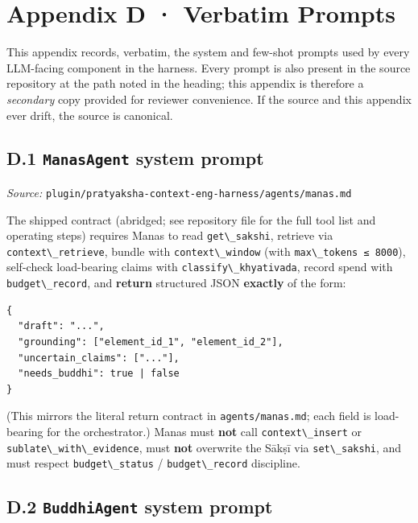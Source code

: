 \section{Appendix D · Verbatim Prompts}\label{appendix-d-verbatim-prompts}

This appendix records, verbatim, the system and few-shot prompts used by every LLM-facing component in the harness. Every prompt is also present in the source repository at the path noted in the heading; this appendix is therefore a \emph{secondary} copy provided for reviewer convenience. If the source and this appendix ever drift, the source is canonical.

\subsection{\texorpdfstring{D.1 \texttt{ManasAgent} system prompt}{D.1 ManasAgent system prompt}}\label{d.1-manasagent-system-prompt}

\emph{Source:} \passthrough{\lstinline!plugin/pratyaksha-context-eng-harness/agents/manas.md!}

The shipped contract (abridged; see repository file for the full tool list and operating steps) requires Manas to read \passthrough{\lstinline!get\_sakshi!}, retrieve via \passthrough{\lstinline!context\_retrieve!}, bundle with \passthrough{\lstinline!context\_window!} (with \passthrough{\lstinline!max\_tokens ≤ 8000!}), self-check load-bearing claims with \passthrough{\lstinline!classify\_khyativada!}, record spend with \passthrough{\lstinline!budget\_record!}, and \textbf{return} structured JSON \textbf{exactly} of the form:

\begin{lstlisting}
{
  "draft": "...",
  "grounding": ["element_id_1", "element_id_2"],
  "uncertain_claims": ["..."],
  "needs_buddhi": true | false
}
\end{lstlisting}

(This mirrors the literal return contract in \passthrough{\lstinline!agents/manas.md!}; each field is load-bearing for the orchestrator.) Manas must \textbf{not} call \passthrough{\lstinline!context\_insert!} or \passthrough{\lstinline!sublate\_with\_evidence!}, must \textbf{not} overwrite the Sākṣī via \passthrough{\lstinline!set\_sakshi!}, and must respect \passthrough{\lstinline!budget\_status!} / \passthrough{\lstinline!budget\_record!} discipline.

\subsection{\texorpdfstring{D.2 \texttt{BuddhiAgent} system prompt}{D.2 BuddhiAgent system prompt}}\label{d.2-buddhiagent-system-prompt}

